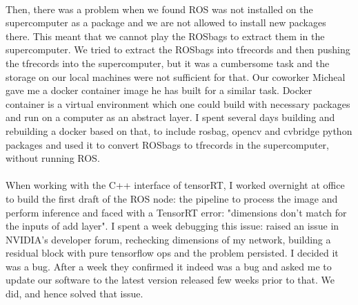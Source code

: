 \paragraph{}
Then, there was a problem when we found ROS was not installed on the supercomputer as a package and we are not allowed to install new packages there. This meant that we cannot play the ROSbags to extract them in the supercomputer. We tried to extract the ROSbags into tfrecords and then pushing the tfrecords into the supercomputer, but it was a cumbersome task and the storage on our local machines were not sufficient for that. Our coworker Micheal gave me a docker container image he has built for a similar task. Docker container is a virtual environment which one could build with necessary packages and run on a computer as an abstract layer. I spent several days building and rebuilding a docker based on that, to include rosbag, opencv and cvbridge python packages and used it to convert ROSbags to tfrecords in the supercomputer, without running ROS. 

\paragraph{}
When working with the C++ interface of tensorRT, I worked overnight at office to build the first draft of the ROS node: the pipeline to process the image and perform inference and faced with a TensorRT error: "dimensions don't match for the inputs of add layer". I spent a week debugging this issue: raised an issue in NVIDIA's developer forum, rechecking dimensions of my network, building a residual block with pure tensorflow ops and the problem persisted. I decided it was a bug.  After a week they confirmed it indeed was a bug and asked me to update our software to the latest version released few weeks prior to that. We did, and hence solved that issue.